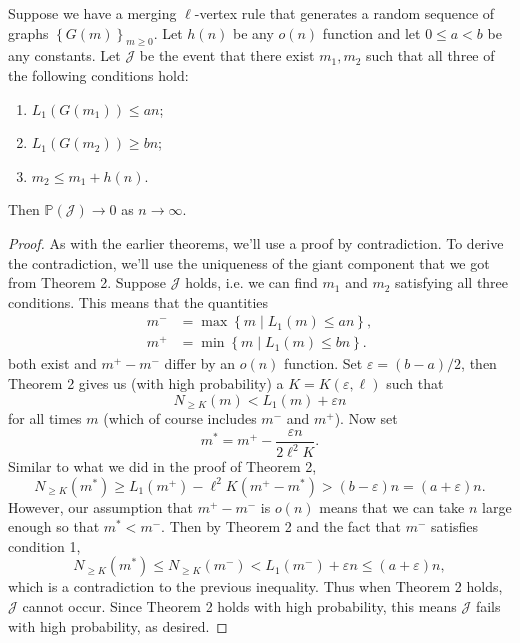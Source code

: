 \documentclass[twoside,10pt]{report}
\begin{document}
\setcounter{thrm}{6}
\begin{thrm}[]
	Suppose we have a merging $\ell$-vertex rule that generates a random sequence of graphs $\left\{ G(m) \right\}_{m \geq 0}$. Let $h(n)$ be any $o(n)$ function and let $0 \leq a < b$ be any constants. Let $\mathcal{J}$ be the event that there exist $m_1,m_2$ such that all three of the following conditions hold:
	\begin{enumerate}
		\item $L_1(G(m_1)) \leq an$;
		\item $L_1(G(m_2)) \geq bn$;
		\item $m_2 \leq m_1 + h(n)$.
	\end{enumerate}
	Then $\mathbb{P}\left( \mathcal{J} \right) \to 0$ as $n\to \infty$.
\end{thrm}
\begin{proof}
	As with the earlier theorems, we'll use a proof by contradiction. To derive the contradiction, we'll use the uniqueness of the giant component that we got from Theorem 2. Suppose $\mathcal{J}$ holds, i.e. we can find $m_1$ and $m_2$ satisfying all three conditions. This means that the quantities
	\begin{align*}
		m^{-} &= \max\left\{ m \;|\; L_1(m) \leq an \right\},\\
		m^{+} &= \min\left\{ m \;|\; L_1(m) \leq bn \right\}.
	\end{align*}
	both exist and $m^+-m^-$ differ by an $o(n)$ function. Set $\varepsilon = (b-a)/2$, then Theorem 2 gives us (with high probability) a $K=K(\varepsilon,\ell)$ such that
	\[
		N_{\geq K}(m) < L_1(m) + \varepsilon n
	\] for all times $m$ (which of course includes $m^-$ and $m^+$). Now set
	\[
	m^* = m^+ - \frac{\varepsilon n}{2 \ell^2 K} .
	\] {\color{red}Similar to what we did in the proof of Theorem 2,}
	\[
		N_{\geq K}(m^*) \geq  L_1(m^+) - \ell^{2}K(m^+-m^*) > (b-\varepsilon)n = (a+\varepsilon)n.
	\] However, our assumption that $m^+ - m^-$ is $o(n)$ means that we can take $n$ large enough so that $m^* < m^-$. Then by Theorem 2 and the fact that $m^-$ satisfies condition 1,
	\[
		N_{\geq K}(m^*) \leq N_{\geq K}(m^-) < L_1(m^-) + \varepsilon n \leq (a+\varepsilon)n,
	\] which is a contradiction to the previous inequality. Thus when Theorem 2 holds, $\mathcal{J}$ cannot occur. Since Theorem 2 holds with high probability, this means $\mathcal{J}$ fails with high probability, as desired.
\end{proof}


\end{document}
